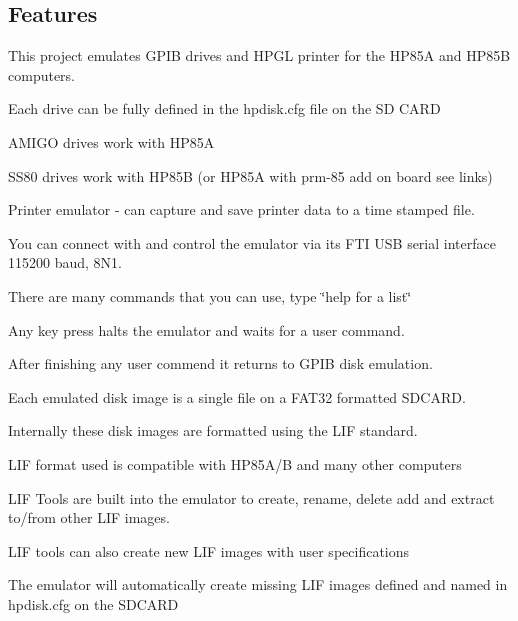 \subsection*{Features}


\begin{DoxyItemize}
\item This project emulates G\+P\+IB drives and H\+P\+GL printer for the H\+P85A and H\+P85B computers.
\begin{DoxyItemize}
\item Each drive can be fully defined in the hpdisk.\+cfg file on the SD C\+A\+RD
\item A\+M\+I\+GO drives work with H\+P85A
\item S\+S80 drives work with H\+P85B (or H\+P85A with prm-\/85 add on board see links)
\item Printer emulator -\/ can capture and save printer data to a time stamped file.
\item You can connect with and control the emulator via its F\+TI U\+SB serial interface 115200 baud, 8\+N1.
\begin{DoxyItemize}
\item There are many commands that you can use, type \char`\"{}help for a list\char`\"{}
\item Any key press halts the emulator and waits for a user command.
\item After finishing any user commend it returns to G\+P\+IB disk emulation.
\end{DoxyItemize}
\item Each emulated disk image is a single file on a F\+A\+T32 formatted S\+D\+C\+A\+RD.
\begin{DoxyItemize}
\item Internally these disk images are formatted using the L\+IF standard.
\begin{DoxyItemize}
\item L\+IF format used is compatible with H\+P85\+A/B and many other computers
\end{DoxyItemize}
\item L\+IF Tools are built into the emulator to create, rename, delete add and extract to/from other L\+IF images.
\begin{DoxyItemize}
\item L\+IF tools can also create new L\+IF images with user specifications
\end{DoxyItemize}
\item The emulator will automatically create missing L\+IF images defined and named in hpdisk.\+cfg on the S\+D\+C\+A\+RD

\end{DoxyItemize}
\end{DoxyItemize}
\end{DoxyItemize}

